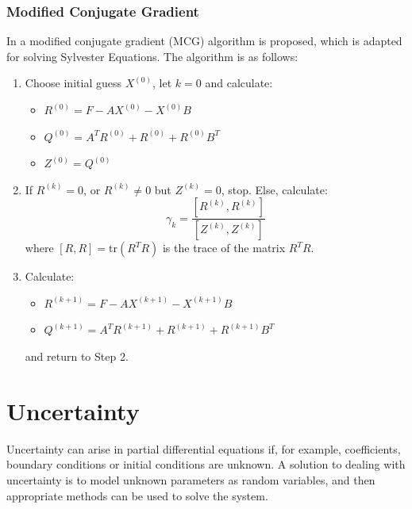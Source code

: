 \documentclass{article}
\numberwithin{equation}{section}
\begin{document}
\subsubsection{Modified Conjugate Gradient}
In \cite{Hou} a modified conjugate gradient (MCG) algorithm is proposed, which is adapted for solving Sylvester Equations. The algorithm is as follows:
\begin{enumerate}
\item Choose initial guess $X^{(0)}$, let $k=0$ and calculate:
	\begin{itemize}
	\item $R^{(0)} = F - AX^{(0)} - X^{(0)}B$
	\item $Q^{(0)} = A^T R^{(0)} + R^{(0)} + R^{(0)} B^T$
	\item $Z^{(0)} = Q^{(0)}$
	\end{itemize}
\item If $R^{(k)} = 0$, or $R^{(k)} \neq 0$ but $Z^{(k)} = 0$, stop. Else, calculate:
\[ \gamma_k = \frac{[R^{(k)}, R^{(k)}]}{[Z^{(k)}, Z^{(k)}]} \]
where $[R,R] = \text{tr}(R^T R)$ is the trace of the matrix $R^T R$.
\item Calculate:
	\begin{itemize}
	\item $R^{(k+1)} = F - AX^{(k+1)} - X^{(k+1)} B$
	\item $Q^{(k+1)} = A^T R^{(k+1)} + R^{(k+1)} + R^{(k+1)} B^T$
	\end{itemize}
	and return to Step 2.
\end{enumerate}
\newpage

\section{Uncertainty}
Uncertainty can arise in partial differential equations if, for example, coefficients, boundary conditions or initial conditions are unknown. A solution to dealing with uncertainty is to model unknown parameters as random variables, and then appropriate methods can be used to solve the system. 
\end{document}
